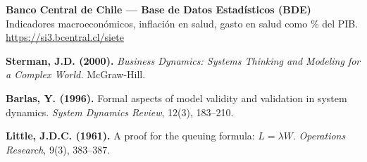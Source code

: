 \documentclass[12pt,a4paper]{article}
\begin{document}
\begin{enumerate}[leftmargin=1.5cm,label=\textbf{[\arabic*]}]
\item \label{ref:bcentral} \textbf{Banco Central de Chile — Base de Datos Estadísticos (BDE)}\\
  Indicadores macroeconómicos, inflación en salud, gasto en salud como \% del PIB.\\
  \url{https://si3.bcentral.cl/siete}

\item \textbf{Sterman, J.D. (2000).} \textit{Business Dynamics: Systems Thinking and Modeling for a Complex World.} McGraw-Hill.

\item \textbf{Barlas, Y. (1996).} Formal aspects of model validity and validation in system dynamics. \textit{System Dynamics Review}, 12(3), 183--210.

\item \textbf{Little, J.D.C. (1961).} A proof for the queuing formula: $L=\lambda W$. \textit{Operations Research}, 9(3), 383--387.

\end{enumerate}
\end{document}
